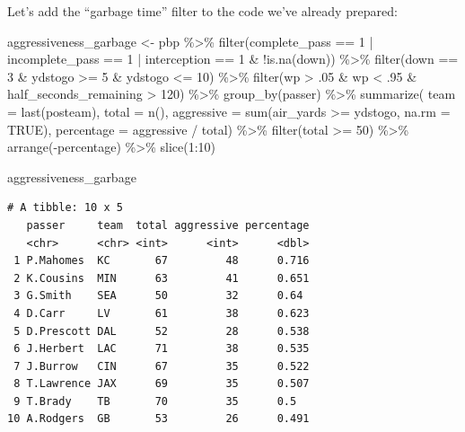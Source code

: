 \documentclass[
  letterpaper,
]{krantz}
\newenvironment{Shaded}{\begin{snugshade}}{\end{snugshade}}
\newcommand{\AttributeTok}[1]{\textcolor[rgb]{0.40,0.45,0.13}{#1}}
\newcommand{\ConstantTok}[1]{\textcolor[rgb]{0.56,0.35,0.01}{#1}}
\newcommand{\DecValTok}[1]{\textcolor[rgb]{0.68,0.00,0.00}{#1}}
\newcommand{\FunctionTok}[1]{\textcolor[rgb]{0.28,0.35,0.67}{#1}}
\newcommand{\NormalTok}[1]{\textcolor[rgb]{0.00,0.23,0.31}{#1}}
\newcommand{\OtherTok}[1]{\textcolor[rgb]{0.00,0.23,0.31}{#1}}
\newcommand{\SpecialCharTok}[1]{\textcolor[rgb]{0.37,0.37,0.37}{#1}}
\begin{document}
Let's add the ``garbage time'' filter to the code we've already
prepared:

\begin{Shaded}
\begin{Highlighting}[]
\NormalTok{aggressiveness\_garbage }\OtherTok{\textless{}{-}}\NormalTok{ pbp }\SpecialCharTok{\%\textgreater{}\%}
  \FunctionTok{filter}\NormalTok{(complete\_pass }\SpecialCharTok{==} \DecValTok{1} \SpecialCharTok{|}
\NormalTok{           incomplete\_pass }\SpecialCharTok{==} \DecValTok{1} \SpecialCharTok{|}
\NormalTok{           interception }\SpecialCharTok{==} \DecValTok{1} \SpecialCharTok{\&}
           \SpecialCharTok{!}\FunctionTok{is.na}\NormalTok{(down)) }\SpecialCharTok{\%\textgreater{}\%}
  \FunctionTok{filter}\NormalTok{(down }\SpecialCharTok{==} \DecValTok{3} \SpecialCharTok{\&}\NormalTok{ ydstogo }\SpecialCharTok{\textgreater{}=} \DecValTok{5} \SpecialCharTok{\&}\NormalTok{ ydstogo }\SpecialCharTok{\textless{}=} \DecValTok{10}\NormalTok{) }\SpecialCharTok{\%\textgreater{}\%}
  \FunctionTok{filter}\NormalTok{(wp }\SpecialCharTok{\textgreater{}}\NormalTok{ .}\DecValTok{05} \SpecialCharTok{\&}\NormalTok{ wp }\SpecialCharTok{\textless{}}\NormalTok{ .}\DecValTok{95} \SpecialCharTok{\&}\NormalTok{ half\_seconds\_remaining }\SpecialCharTok{\textgreater{}} \DecValTok{120}\NormalTok{) }\SpecialCharTok{\%\textgreater{}\%}
  \FunctionTok{group\_by}\NormalTok{(passer) }\SpecialCharTok{\%\textgreater{}\%}
  \FunctionTok{summarize}\NormalTok{(}
    \AttributeTok{team =} \FunctionTok{last}\NormalTok{(posteam),}
    \AttributeTok{total =} \FunctionTok{n}\NormalTok{(),}
    \AttributeTok{aggressive =} \FunctionTok{sum}\NormalTok{(air\_yards }\SpecialCharTok{\textgreater{}=}\NormalTok{ ydstogo, }\AttributeTok{na.rm =} \ConstantTok{TRUE}\NormalTok{),}
    \AttributeTok{percentage =}\NormalTok{ aggressive }\SpecialCharTok{/}\NormalTok{ total) }\SpecialCharTok{\%\textgreater{}\%}
  \FunctionTok{filter}\NormalTok{(total }\SpecialCharTok{\textgreater{}=} \DecValTok{50}\NormalTok{) }\SpecialCharTok{\%\textgreater{}\%}
  \FunctionTok{arrange}\NormalTok{(}\SpecialCharTok{{-}}\NormalTok{percentage) }\SpecialCharTok{\%\textgreater{}\%}
  \FunctionTok{slice}\NormalTok{(}\DecValTok{1}\SpecialCharTok{:}\DecValTok{10}\NormalTok{)}
  
\NormalTok{aggressiveness\_garbage}
\end{Highlighting}
\end{Shaded}

\begin{verbatim}
# A tibble: 10 x 5
   passer     team  total aggressive percentage
   <chr>      <chr> <int>      <int>      <dbl>
 1 P.Mahomes  KC       67         48      0.716
 2 K.Cousins  MIN      63         41      0.651
 3 G.Smith    SEA      50         32      0.64 
 4 D.Carr     LV       61         38      0.623
 5 D.Prescott DAL      52         28      0.538
 6 J.Herbert  LAC      71         38      0.535
 7 J.Burrow   CIN      67         35      0.522
 8 T.Lawrence JAX      69         35      0.507
 9 T.Brady    TB       70         35      0.5  
10 A.Rodgers  GB       53         26      0.491
\end{verbatim}
\end{document}

